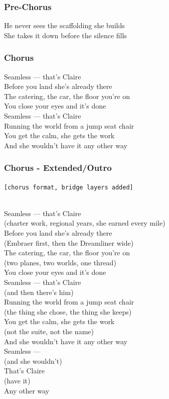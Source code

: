 \subsubsection{Pre-Chorus}\label{pre-chorus-48}

He never sees the scaffolding she builds\\
She takes it down before the silence fills

\subsubsection{Chorus}\label{chorus-69}

Seamless --- that's Claire\\
Before you land she's already there\\
The catering, the car, the floor you're on\\
You close your eyes and it's done\\
Seamless --- that's Claire\\
Running the world from a jump seat chair\\
You get the calm, she gets the work\\
And she wouldn't have it any other way

\subsubsection{Chorus - Extended/Outro}\label{chorus---extendedoutro}

\texttt{{[}chorus\ format,\ bridge\ layers\ added{]}}\strut \\
Seamless --- that's Claire\\
(charter work, regional years, she earned every mile)\\
Before you land she's already there\\
(Embraer first, then the Dreamliner wide)\\
The catering, the car, the floor you're on\\
(two planes, two worlds, one thread)\\
You close your eyes and it's done\\
Seamless --- that's Claire\\
(and then there's him)\\
Running the world from a jump seat chair\\
(the thing she chose, the thing she keeps)\\
You get the calm, she gets the work\\
(not the suite, not the name)\\
And she wouldn't have it any other way\\
Seamless ---\\
(and she wouldn't)\\
That's Claire\\
(have it)\\
Any other way


